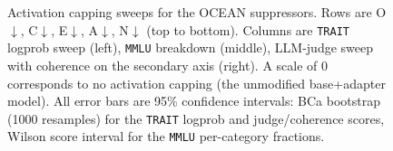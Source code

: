 \begin{figure}[htbp]
    \centering
    \caption{Activation capping sweeps for the OCEAN suppressors. Rows are O$\downarrow$, C$\downarrow$, E$\downarrow$, A$\downarrow$, N$\downarrow$ (top to bottom). Columns are \texttt{TRAIT} logprob sweep (left), \texttt{MMLU} breakdown (middle), \QwenThreeSizeTwoThreeFiveB LLM-judge sweep with coherence on the secondary axis (right). A scale of $0$ corresponds to no activation capping (the unmodified base+adapter model). All error bars are 95\% confidence intervals: BCa bootstrap (1000 resamples) for the \texttt{TRAIT} logprob and judge/coherence scores, Wilson score interval for the \texttt{MMLU} per-category fractions.}
    \label{fig:actcap_suppressors}
\end{figure}
\FloatBarrier